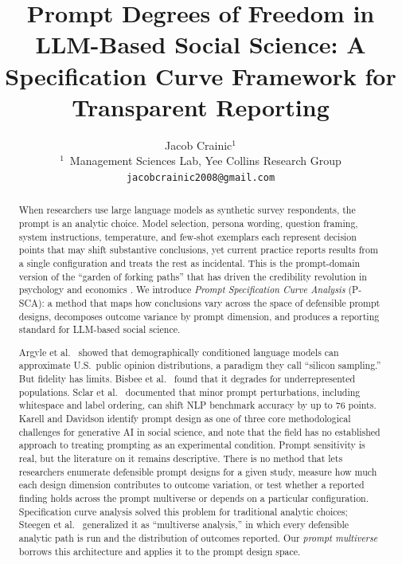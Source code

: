 \documentclass[10pt]{article}
\title{\textbf{Prompt Degrees of Freedom in LLM-Based Social Science: A Specification Curve Framework for Transparent Reporting}}
\author{%
\small Jacob Crainic$^{1}$\\[4pt]
{\small $^{1}$~Management Sciences Lab, Yee Collins Research Group}\\[2pt]
{\small \texttt{jacobcrainic2008@gmail.com}}%
}
\date{}
\begin{document}
\maketitle

\begin{abstract}
When researchers use large language models as synthetic survey respondents, the prompt is an analytic choice. Model selection, persona wording, question framing, system instructions, temperature, and few-shot exemplars each represent decision points that may shift substantive conclusions, yet current practice reports results from a single configuration and treats the rest as incidental. This is the prompt-domain version of the ``garden of forking paths'' that has driven the credibility revolution in psychology and economics \cite{gelman2014statistical, simonsohn2020specification}. We introduce \textit{Prompt Specification Curve Analysis} (P-SCA): a method that maps how conclusions vary across the space of defensible prompt designs, decomposes outcome variance by prompt dimension, and produces a reporting standard for LLM-based social science.

Argyle et al.\ \cite{argyle2023out} showed that demographically conditioned language models can approximate U.S.\ public opinion distributions, a paradigm they call ``silicon sampling.'' But fidelity has limits. Bisbee et al.\ \cite{bisbee2024synthetic} found that it degrades for underrepresented populations. Sclar et al.\ \cite{sclar2024quantifying} documented that minor prompt perturbations, including whitespace and label ordering, can shift NLP benchmark accuracy by up to 76 points. Karell and Davidson \cite{karell2025integrating} identify prompt design as one of three core methodological challenges for generative AI in social science, and note that the field has no established approach to treating prompting as an experimental condition. Prompt sensitivity is real, but the literature on it remains descriptive. There is no method that lets researchers enumerate defensible prompt designs for a given study, measure how much each design dimension contributes to outcome variation, or test whether a reported finding holds across the prompt multiverse or depends on a particular configuration. Specification curve analysis \cite{simonsohn2020specification} solved this problem for traditional analytic choices; Steegen et al.\ \cite{steegen2016increasing} generalized it as ``multiverse analysis,'' in which every defensible analytic path is run and the distribution of outcomes reported. Our \textit{prompt multiverse} borrows this architecture and applies it to the prompt design space.


\end{abstract}
\end{document}

